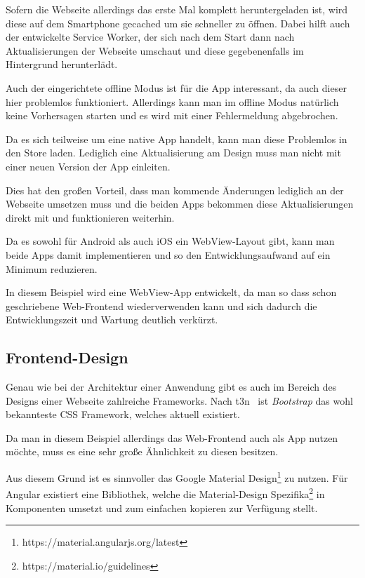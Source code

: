 Sofern die Webseite allerdings das erste Mal komplett heruntergeladen ist, wird diese auf dem Smartphone gecached um sie
schneller zu öffnen. Dabei hilft auch der entwickelte Service Worker, der sich nach dem Start dann nach Aktualisierungen
der Webseite umschaut und diese gegebenenfalls im Hintergrund herunterlädt.

Auch der eingerichtete offline Modus ist für die App interessant, da auch dieser hier problemlos funktioniert.
Allerdings kann man im offline Modus natürlich keine Vorhersagen starten und es wird mit einer Fehlermeldung abgebrochen.

Da es sich teilweise um eine native App handelt, kann man diese Problemlos in den Store laden. Lediglich eine
Aktualisierung am Design muss man nicht mit einer neuen Version der App einleiten.

Dies hat den großen Vorteil, dass man kommende Änderungen lediglich an der Webseite umsetzen muss und die beiden Apps
bekommen diese Aktualisierungen direkt mit und funktionieren weiterhin.

Da es sowohl für Android als auch iOS ein WebView-Layout gibt, kann man beide Apps damit implementieren und so den
Entwicklungsaufwand auf ein Minimum reduzieren.

In diesem Beispiel wird eine WebView-App entwickelt, da man so dass schon geschriebene Web-Frontend wiederverwenden
kann und sich dadurch die Entwicklungszeit und Wartung deutlich verkürzt.

\subsection{Frontend-Design}
Genau wie bei der Architektur einer Anwendung gibt es auch im Bereich des Designs einer Webseite zahlreiche Frameworks.
Nach t3n~\cite{online_analyse_css} ist \textit{Bootstrap} das wohl bekannteste CSS Framework, welches aktuell existiert.

Da man in diesem Beispiel allerdings das Web-Frontend auch als App nutzen möchte, muss es eine sehr große Ähnlichkeit zu
diesen besitzen.

Aus diesem Grund ist es sinnvoller das Google Material Design\footnote{https://material.angularjs.org/latest} zu nutzen.
Für Angular existiert eine Bibliothek, welche die Material-Design Spezifika\footnote{https://material.io/guidelines} in
Komponenten umsetzt und zum einfachen kopieren zur Verfügung stellt.